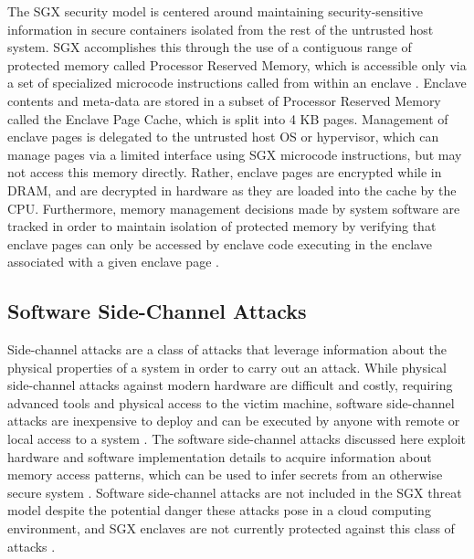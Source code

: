 The SGX security model is centered around maintaining security-sensitive information in secure containers isolated from the rest of the untrusted host system. SGX accomplishes this through the use of a contiguous range of protected memory called Processor Reserved Memory, which is accessible only via a set of specialized microcode instructions called from within an enclave \cite{costan_intel_2016}. Enclave contents and meta-data are stored in a subset of Processor Reserved Memory called the Enclave Page Cache, which is split into 4 KB pages. Management of enclave pages is delegated to the untrusted host OS or hypervisor, which can manage pages via a limited interface using SGX microcode instructions, but may not access this memory directly. Rather, enclave pages are encrypted while in DRAM, and are decrypted in hardware as they are loaded into the cache by the CPU. Furthermore, memory management decisions made by system software are tracked in order to maintain isolation of protected memory by verifying that enclave pages can only be accessed by enclave code executing in the enclave associated with a given enclave page \cite{intel_corporation_intel_2016, costan_intel_2016, moghimi_cachezoom:_2017}. 

\subsection{Software Side-Channel Attacks}

Side-channel attacks are a class of attacks that leverage information about the physical properties of a system in order to carry out an attack. While physical side-channel attacks against modern hardware are difficult and costly, requiring advanced tools and physical access to the victim machine, software side-channel attacks are inexpensive to deploy and can be executed by anyone with remote or local access to a system \cite{costan_intel_2016}. The software side-channel attacks discussed here exploit hardware and software implementation details to acquire information about memory access patterns, which can be used to infer secrets from an otherwise secure system \cite{gotzfried_cache_2017, schwarz_malware_2017, xu_controlled-channel_2015, shinde_preventing_2015}. Software side-channel attacks are not included in the SGX threat model despite the potential danger these attacks pose in a cloud computing environment, and SGX enclaves are not currently protected against this class of attacks \cite{moghimi_cachezoom:_2017, intel_corporation_tutorial_2015}.

